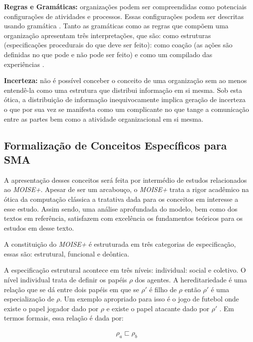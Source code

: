 \textbf{Regras e Gramáticas:} organizações podem ser compreendidas como potenciais configurações de atividades e processos. Essas configurações podem ser descritas usando gramática \cite{grammarselforganizationmodel,grammarselforganizationmodel2}. Tanto as gramáticas como as regras que compõem uma organização apresentam três interpretações, que são: como estruturas (especificações procedurais do que deve ser feito): como coação (as ações são definidas no que pode e não pode ser feito) e como um compilado das experiências \cite{organiationofmultiagentsystem}.

\textbf{Incerteza:} não é possível conceber o conceito de uma organização sem ao menos entendê-la como uma estrutura que distribui informação em si mesma. Sob esta ótica, a distribuição de informação inequivocamente implica geração de incerteza o que por sua vez se manifesta como um complicante no que tange a comunicação entre as partes bem como a atividade organizacional em si mesma.

\subsection{Formalização de Conceitos Específicos para SMA}
\label{moiseformalizesma}
A apresentação desses conceitos será feita por intermédio de estudos relacionados ao \textit{MOISE+}. Apesar de ser um arcabouço, o \textit{MOISE+} trata a rigor acadêmico na ótica da computação clássica a tratativa dada para os conceitos em interesse a esse estudo. Assim sendo, uma análise aprofundada do modelo, bem como dos textos em referência, satisfazem com excelência os fundamentos teóricos para os estudos em desse texto. 

A constituição do \textit{MOISE+} é estruturada em três categorias de especificação, essas são: estrutural, funcional e deôntica. 

A especificação estrutural acontece em três níveis: individual: social e coletivo. O nível individual trata de definir os papéis $\rho$ dos agentes. A hereditariedade é uma relação que se dá entre dois papéis em que se $\rho'$ é filho de $\rho$ então $\rho'$ é uma especialização de $\rho$. Um exemplo apropriado para isso é o jogo de futebol onde existe o papel jogador dado por $\rho$ e existe o papel atacante dado por $\rho'$ \cite{moiseframework,roleone,roletwo,dynamicagenttemporalstruct}. Em termos formais, essa relação é dada por: 

\begin{eqnarray}
\rho_a \sqsubset \rho_b
\end{eqnarray}

